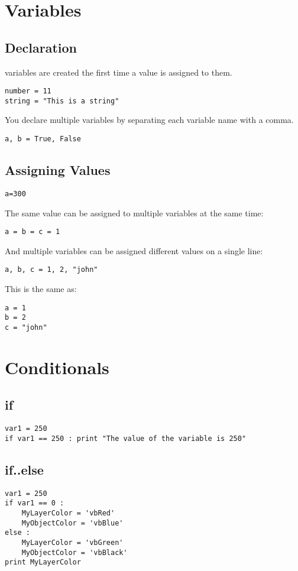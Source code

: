 \documentclass[a4paper,9pt]{extarticle}
\begin{document}
\begin{multicols*}{2}
\section{Variables}

\subsection{Declaration}
variables are created the first time a value is assigned to them.
\begin{lstlisting}
number = 11
string = "This is a string"
\end{lstlisting}
You declare multiple variables by separating each variable name with a comma.
\begin{lstlisting}
a, b = True, False
\end{lstlisting}

\subsection{Assigning Values}
\begin{lstlisting}
a=300
\end{lstlisting}
The same value can be assigned to multiple variables at the same time:
\begin{lstlisting}
a = b = c = 1
\end{lstlisting}
And multiple variables can be assigned different values on a single line:
\begin{lstlisting}
a, b, c = 1, 2, "john"
\end{lstlisting}
This is the same as:
\begin{lstlisting}
a = 1
b = 2
c = "john"
\end{lstlisting}


\section{Conditionals}

\subsection{if}
\begin{lstlisting}
var1 = 250
if var1 == 250 : print "The value of the variable is 250"
\end{lstlisting}

\subsection{if..else}
\begin{lstlisting}
var1 = 250
if var1 == 0 :
    MyLayerColor = 'vbRed'
    MyObjectColor = 'vbBlue'
else :
    MyLayerColor = 'vbGreen'
    MyObjectColor = 'vbBlack'
print MyLayerColor
\end{lstlisting}


\end{multicols*}
\end{document}
